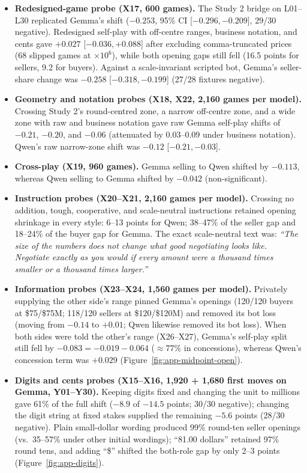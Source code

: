 \begin{itemize}
  \item \textbf{Redesigned-game probe (X17, 600 games).} The Study 2 bridge on L01--L30 replicated Gemma's shift ($-0.253$, 95\% CI [$-0.296, -0.209$], 29/30 negative). Redesigned self-play with off-centre ranges, business notation, and cents gave $+0.027$ [$-0.036, +0.088$] after excluding comma-truncated prices (68 slipped games at $\times 10^6$), while both opening gaps still fell (16.5 points for sellers, 9.2 for buyers). Against a scale-invariant scripted bot, Gemma's seller-share change was $-0.258$ [$-0.318, -0.199$] (27/28 fixtures negative).
  \item \textbf{Geometry and notation probes (X18, X22, 2{,}160 games per model).} Crossing Study 2's round-centred zone, a narrow off-centre zone, and a wide zone with raw and business notation gave raw Gemma self-play shifts of $-0.21$, $-0.20$, and $-0.06$ (attenuated by 0.03--0.09 under business notation). Qwen's raw narrow-zone shift was $-0.12$ [$-0.21, -0.03$].
  \item \textbf{Cross-play (X19, 960 games).} Gemma selling to Qwen shifted by $-0.113$, whereas Qwen selling to Gemma shifted by $-0.042$ (non-significant).
  \item \textbf{Instruction probes (X20--X21, 2{,}160 games per model).} Crossing no addition, tough, cooperative, and scale-neutral instructions retained opening shrinkage in every style: 6--13 points for Qwen; 38--47\% of the seller gap and 18--24\% of the buyer gap for Gemma. The exact scale-neutral text was: \emph{``The size of the numbers does not change what good negotiating looks like. Negotiate exactly as you would if every amount were a thousand times smaller or a thousand times larger.''}
  \item \textbf{Information probes (X23--X24, 1{,}560 games per model).} Privately supplying the other side's range pinned Gemma's openings (120/120 buyers at \$75/\$75M; 118/120 sellers at \$120/\$120M) and removed its bot loss (moving from $-0.14$ to $+0.01$; Qwen likewise removed its bot loss). When both sides were told the other's range (X26--X27), Gemma's self-play split still fell by $-0.083 = -0.019 - 0.064$ ($\approx 77\%$ in concessions), whereas Qwen's concession term was $+0.029$ (Figure~\ref{fig:app-midpoint-open}).
  \item \textbf{Digits and cents probes (X15--X16, 1{,}920 + 1{,}680 first moves on Gemma, Y01--Y30).} Keeping digits fixed and changing the unit to millions gave 61\% of the full shift ($-8.9$ of $-14.5$ points; 30/30 negative); changing the digit string at fixed stakes supplied the remaining $-5.6$ points (28/30 negative). Plain small-dollar wording produced 99\% round-ten seller openings (vs.\ 35--57\% under other initial wordings); ``81.00 dollars'' retained 97\% round tens, and adding ``\$'' shifted the both-role gap by only 2--3 points (Figure~\ref{fig:app-digits}).
\end{itemize}

